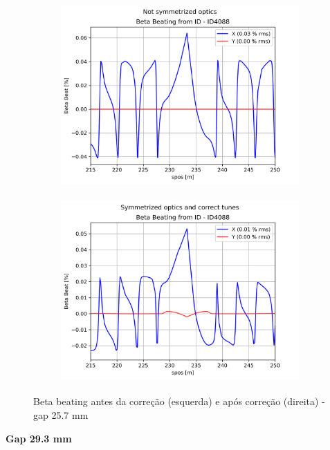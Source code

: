 \documentclass[a4paper,12pt]{article}
\begin{document}
\begin{figure}[H]
\begin{subfigure}{0.5\textwidth}
\includegraphics[width=0.9\linewidth, height=7cm]{figs/phase-25 gap25 uncorrected-optics.png} 
\label{fig:subim1-2525}
\end{subfigure}
\begin{subfigure}{0.5\textwidth}
\includegraphics[width=0.9\linewidth, height=7cm]{figs/phase-25 gap25 corrected-optics-tunes.png}
\label{fig:subim2-2525}
\end{subfigure}
\caption{Beta beating antes da correção (esquerda) e após correção (direita) - gap 25.7 mm}
\label{fig:bb-25_25}
\end{figure}

\textbf{Gap 29.3 mm} \\
\end{document}
